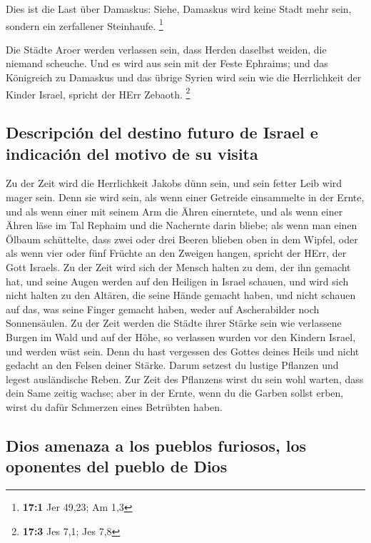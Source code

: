  Dies ist die Last über Damaskus: Siehe, Damaskus wird
keine Stadt mehr sein, sondern ein zerfallener Steinhaufe. \footnote{\textbf{17:1}
  Jer 49,23; Am 1,3}

 Die Städte Aroer werden verlassen sein, dass Herden
daselbst weiden, die niemand scheuche.  Und es wird aus
sein mit der Feste Ephraims; und das Königreich zu Damaskus und das
übrige Syrien wird sein wie die Herrlichkeit der Kinder Israel, spricht
der HErr Zebaoth. \footnote{\textbf{17:3} Jes 7,1; Jes 7,8}

\hypertarget{descripciuxf3n-del-destino-futuro-de-israel-e-indicaciuxf3n-del-motivo-de-su-visita}{%
\subsection{Descripción del destino futuro de Israel e indicación del
motivo de su
visita}\label{descripciuxf3n-del-destino-futuro-de-israel-e-indicaciuxf3n-del-motivo-de-su-visita}}

 Zu der Zeit wird die Herrlichkeit Jakobs dünn sein, und
sein fetter Leib wird mager sein.  Denn sie wird sein, als
wenn einer Getreide einsammelte in der Ernte, und als wenn einer mit
seinem Arm die Ähren einerntete, und als wenn einer Ähren läse im Tal
Rephaim  und die Nachernte darin bliebe; als wenn man
einen Ölbaum schüttelte, dass zwei oder drei Beeren blieben oben in dem
Wipfel, oder als wenn vier oder fünf Früchte an den Zweigen hangen,
spricht der HErr, der Gott Israels.  Zu der Zeit wird sich
der Mensch halten zu dem, der ihn gemacht hat, und seine Augen werden
auf den Heiligen in Israel schauen,  und wird sich nicht
halten zu den Altären, die seine Hände gemacht haben, und nicht schauen
auf das, was seine Finger gemacht haben, weder auf Ascherabilder noch
Sonnensäulen.  Zu der Zeit werden die Städte ihrer Stärke
sein wie verlassene Burgen im Wald und auf der Höhe, so verlassen wurden
vor den Kindern Israel, und werden wüst sein.  Denn du
hast vergessen des Gottes deines Heils und nicht gedacht an den Felsen
deiner Stärke. Darum setzest du lustige Pflanzen und legest ausländische
Reben.  Zur Zeit des Pflanzens wirst du sein wohl warten,
dass dein Same zeitig wachse; aber in der Ernte, wenn du die Garben
sollst erben, wirst du dafür Schmerzen eines Betrübten haben.

\hypertarget{dios-amenaza-a-los-pueblos-furiosos-los-oponentes-del-pueblo-de-dios}{%
\subsection{Dios amenaza a los pueblos furiosos, los oponentes del
pueblo de
Dios}\label{dios-amenaza-a-los-pueblos-furiosos-los-oponentes-del-pueblo-de-dios}}

